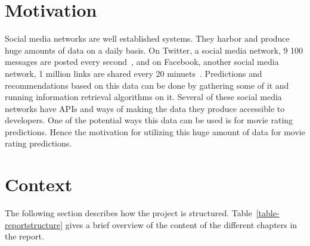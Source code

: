 \section{Motivation}
Social media networks are well established systems. They harbor and produce huge amounts of data on a daily basis. On Twitter, a social media network, 9 100 messages are posted every second~\cite{twitt-stats}, and on Facebook, another social media network, 1 million links are shared every 20 minuets~\cite{face-stats}. Predictions and recommendations based on this data can be done by gathering some of it and running information retrieval algorithms on it. Several of these social media networks have APIs and ways of making the data they produce accessible to developers. One of the potential ways this data can be used is for movie rating predictions. Hence the motivation for utilizing this huge amount of data for movie rating predictions.

\section{Context}
The following section describes how the project is structured. Table~\ref{table-reportstructure} gives a brief overview of the content of the different chapters in the report.

